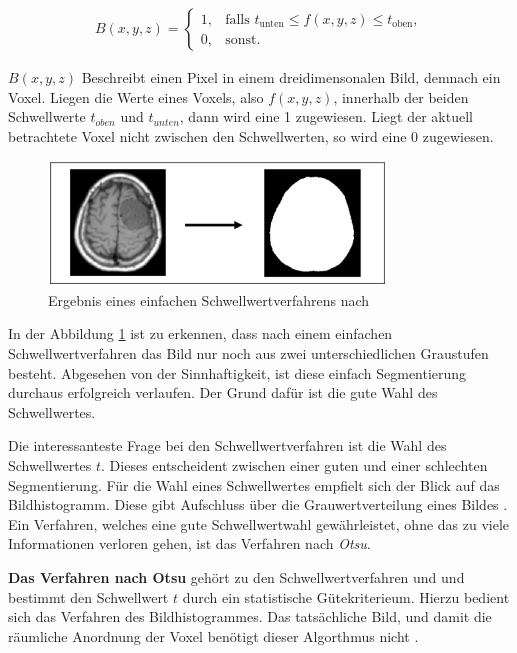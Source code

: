 \begin{align}
	\label{equ:schwellwertverfahren}B(x, y, z) = \begin{cases}1,&\text{falls }t_{\text{unten}}\leq f(x, y, z) \leq t_{\text{oben}}, \\ 0,&\text{sonst}.\end{cases}
\end{align}

$B(x, y, z)$ Beschreibt einen Pixel in einem dreidimensonalen Bild, demnach ein
Voxel. Liegen die Werte eines Voxels, also $f(x, y, z)$, innerhalb der beiden
Schwellwerte $t_{oben}$ und $t_{unten}$, dann wird eine 1 zugewiesen. Liegt der
aktuell betrachtete Voxel nicht zwischen den Schwellwerten, so wird eine 0 zugewiesen.

\begin{figure}[h]
	\centering
	\includegraphics[width=0.8\textwidth]{img/beispiel_schwellwertverfahren.jpg}
	\caption{Ergebnis eines einfachen Schwellwertverfahrens nach \citet[Seite 96]{handels2000}}
	\label{fig:binäres_schwellwertverfahren}
\end{figure}

In der Abbildung \ref{fig:binäres_schwellwertverfahren} ist zu erkennen, dass nach
einem einfachen Schwellwertverfahren das Bild nur noch aus zwei unterschiedlichen
Graustufen besteht. Abgesehen von der Sinnhaftigkeit, ist diese einfach Segmentierung
durchaus erfolgreich verlaufen. Der Grund dafür ist die gute Wahl des
Schwellwertes.

Die interessanteste Frage bei den Schwellwertverfahren ist die Wahl des
Schwellwertes $t$. Dieses entscheident zwischen einer guten und einer schlechten Segmentierung.
Für die Wahl eines Schwellwertes empfielt sich der Blick auf das Bildhistogramm.
Diese gibt Aufschluss über die Grauwertverteilung eines Bildes \citep[vgl.][Seite361]{lehmann2013bildverarbeitung}.
Ein Verfahren, welches eine gute
Schwellwertwahl gewährleistet, ohne das zu viele Informationen verloren gehen,
ist das Verfahren nach \textit{Otsu}.

\textbf{Das Verfahren nach Otsu} gehört zu den Schwellwertverfahren und und
bestimmt den Schwellwert $t$ durch ein statistische Gütekriterieum. Hierzu bedient
sich das Verfahren des Bildhistogrammes. Das tatsächliche Bild, und damit die räumliche
Anordnung der Voxel benötigt dieser Algorthmus nicht \citep[vgl.][Seite 264]{lehmann2013bildverarbeitung}.

